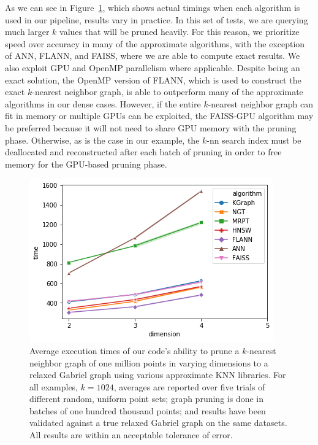 As we can see in Figure~\ref{fig:knn_benchmark}, which shows actual timings when each algorithm is used in our pipeline, results vary in practice.
%
In this set of tests, we are querying much larger $k$ values that will be pruned heavily.
%
For this reason, we prioritize speed over accuracy in many of the approximate algorithms, with the exception of ANN, FLANN, and FAISS, where we are able to compute exact results.
%
We also exploit GPU and OpenMP parallelism where applicable.
%
Despite being an exact solution, the OpenMP version of FLANN, which is used to construct the exact $k$-nearest neighbor graph, is able to outperform many of the approximate algorithms in our dense cases.
%
However, if the entire $k$-nearest neighbor graph can fit in memory or multiple GPUs can be exploited, the FAISS-GPU algorithm may be preferred because it will not need to share GPU memory with the pruning phase.
%
Otherwise, as is the case in our example, the $k$-nn search index must be deallocated and reconstructed after each batch of pruning in order to free memory for the GPU-based pruning phase.

\begin{figure}[t]
    \centering
      \includegraphics[width=.95\linewidth]{figs/chap7/relaxed_gabriel_benchmark_1M.png}
    \caption[Custom benchmark performance for various $k$-nn implementations]{Average execution times of our code's ability to prune a
    $k$-nearest neighbor graph of one million points in varying dimensions
    to a relaxed Gabriel graph using various approximate KNN libraries.
    For all examples, $k=1024$, averages are reported over five trials
    of different random, uniform point sets; graph pruning is done
    in batches of one hundred thousand points; and results have been
    validated against a true relaxed Gabriel graph on the same datasets.
    All results are within an acceptable tolerance of error.
  }
  \label{fig:knn_benchmark}
\end{figure}

